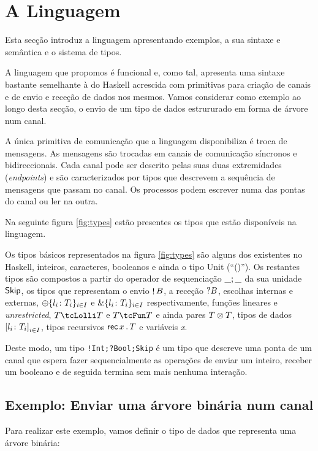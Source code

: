 \section{A Linguagem}
\lstset{language=CFST}
Esta secção introduz a linguagem apresentando exemplos, a sua sintaxe e semântica e o sistema de tipos. 

A linguagem que propomos é funcional e, como tal, apresenta uma sintaxe bastante semelhante à do Haskell acrescida com primitivas para criação de canais e de envio e receção de dados nos mesmos. Vamos considerar como exemplo ao longo desta secção, o envio de um tipo de dados estrururado em forma de árvore num canal.

A única primitiva de comunicação que a linguagem disponibiliza é troca de mensagens. As mensagens são trocadas em canais de comunicação síncronos e bidireccionais. Cada canal pode ser descrito pelas suas duas extremidades (\textit{endpoints}) e são caracterizados por tipos que descrevem a sequência de mensagens que passam no canal.
Os processos podem escrever numa das pontas do canal ou ler na outra.

Na seguinte figura \ref{fig:types} estão presentes os tipos que estão disponíveis na linguagem.



Os tipos básicos representados na figura \ref{fig:types} são alguns dos existentes no Haskell, inteiros, caracteres, booleanos e ainda o tipo Unit (``()''). Os restantes tipos são compostos a partir do operador de sequenciação $\_;\_$ da sua unidade $\mathsf{Skip}$, os tipos que representam o envio $\mathop! B$, a receção $?B$, escolhas internas e externas, $\oplus\{l_i\colon T_i\}_{i\in I}$ e $\&\{l_i\colon T_i\}_{i\in I}$ respectivamente, funções lineares e \textit{unrestricted}, $\tLinFun{T}{T}$ e $\tUnFun{T}{T}$ e ainda pares $T\otimes T$, tipos de dados ${[l_i\colon T_i]}_{i\in I}$, tipos recursivos $\mathsf{rec}\,x\,.\,T$ e variáveis \textit{x}.

Deste modo, um tipo \lstinline"!Int;?Bool;Skip" é um tipo que descreve uma ponta de um canal que espera fazer sequencialmente as operações de enviar um inteiro, receber um booleano e de seguida termina sem mais nenhuma interação.

\subsection{Exemplo: Enviar uma árvore binária num canal}
\label{sec:example}
Para realizar este exemplo, vamos definir o tipo de dados que representa uma árvore binária:

